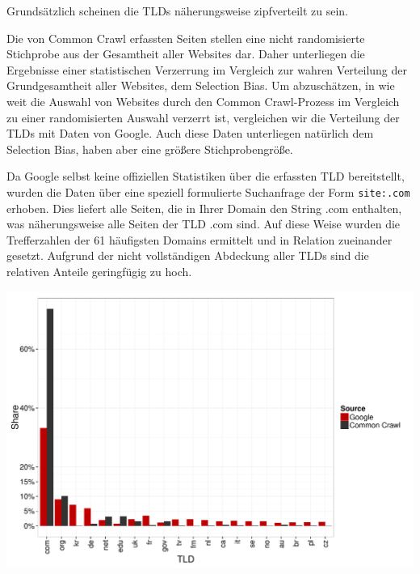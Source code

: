 \documentclass[a4paper,12pt,titlepage=false]{scrreprt}
\begin{document}
Grundsätzlich scheinen die TLDs näherungsweise zipfverteilt zu sein.

\clearpage

\begin{figure}
    \label{wrap-fig:3}
    \def\svgwidth{.45\textwidth}
    
\end{figure}

Die von Common Crawl erfassten Seiten stellen eine nicht randomisierte Stichprobe aus der Gesamtheit aller Websites dar. Daher unterliegen die Ergebnisse einer statistischen Verzerrung im Vergleich zur wahren Verteilung der Grundgesamtheit aller Websites, dem Selection Bias. Um abzuschätzen, in wie weit die Auswahl von Websites durch den Common Crawl-Prozess im Vergleich zu einer randomisierten Auswahl verzerrt ist, vergleichen wir die Verteilung der TLDs mit Daten von Google. Auch diese Daten unterliegen natürlich dem Selection Bias, haben aber eine größere Stichprobengröße.

Da Google selbst keine offiziellen Statistiken über die erfassten TLD bereitstellt, wurden die Daten über eine speziell formulierte Suchanfrage der Form \texttt{site:.com} erhoben. Dies liefert alle Seiten, die in Ihrer Domain den String .com enthalten, was näherungsweise alle Seiten der TLD .com sind. Auf diese Weise wurden die Trefferzahlen der 61 häufigsten Domains ermittelt und in Relation zueinander gesetzt. Aufgrund der nicht vollständigen Abdeckung aller TLDs sind die relativen Anteile geringfügig zu hoch.

\begin{center}
    \includegraphics[width=.9\textwidth]{plots/plot_tld_comparison}
\end{center}
\end{document}
